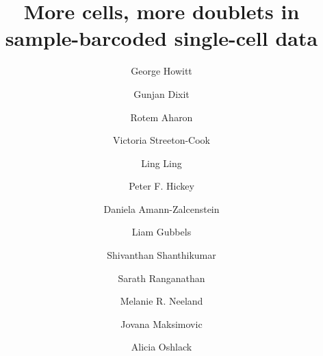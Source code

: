 \documentclass[unnumsec,webpdf,modern,large]{oup-authoring-template}
\begin{document}
	
	
	
	
	\title[Finding multiplets]{More cells, more doublets in sample-barcoded single-cell data}
	
	\author[1, 2]{George Howitt}
	\author[1, 2]{Gunjan Dixit}
	\author[1,2]{Rotem Aharon}
	\author[1]{Victoria Streeton-Cook}
	\author[3]{Ling Ling}
	\author[3,4]{Peter F. Hickey}
	\author[3,4]{Daniela Amann-Zalcenstein}
	\author[5]{Liam Gubbels}
	\author[5,6,7]{Shivanthan Shanthikumar}
	\author[5,6,7]{Sarath Ranganathan}
	\author[5,6]{Melanie R. Neeland}
	\author[1, 2]{Jovana Maksimovic}
	\author[1, 2, 8,$\ast$]{Alicia Oshlack}
	
	
	\address[1]{Computational Biology Program, Peter MacCallum Cancer Centre, Parkville, VIC, Australia}
	\address[2]{Sir Peter MacCallum Department of Oncology, University of Melbourne, Parkville, VIC, Australia}
	\address[3]{The Walter and Eliza Hall Institute of Medical Research, Parkville, VIC 3052, Australia}
	\address[4]{Department of Medical Biology, University of Melbourne, Parkville, VIC, Australia}
	\address[5]{Respiratory Diseases, Murdoch Children’s Research Institute, Parkville, VIC, Australia}
	\address[6]{Respiratory and Sleep Medicine, Royal Children’s Hospital, Parkville, VIC, Australia}
	\address[7]{Department of Paediatrics, University of Melbourne, Parkville, VIC, Australia}
	\address[8]{School of Mathematics and Statistics, University of Melbourne, Parkville, VIC, Australia}
		
		
	
	
	
\end{document}
